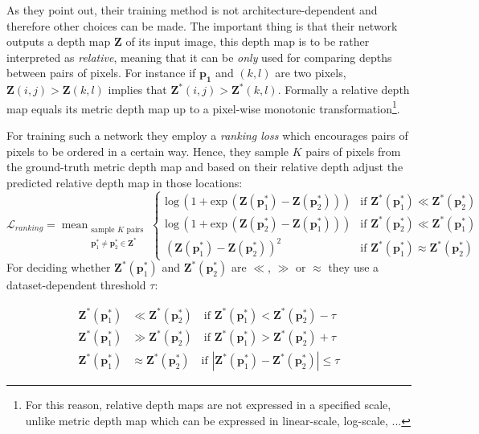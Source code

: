 As they point out, their training method is not architecture-dependent and therefore other choices can be made.
The important thing is that their network outputs a depth map $\mathbf{Z}$ of its input image, this depth map is to be rather interpreted as \textit{relative}, meaning that it can be \textit{only} used for comparing depths between pairs of pixels.
For instance if $\mathbf{p_{1}}$ and $(k,l)$ are two pixels, $\mathbf{Z}(i, j) > \mathbf{Z}(k,l)$ implies that $\mathbf{Z}^{*}(i, j) > \mathbf{Z}^{*}(k,l)$.
Formally a relative depth map equals its metric depth map up to a pixel-wise monotonic transformation\footnote{For this reason, relative depth maps are not expressed in a specified scale, unlike metric depth map which can be expressed in linear-scale, log-scale, ...}.

For training such a network they employ a \textit{ranking loss} which encourages pairs of pixels to be ordered in a certain way.
Hence, they sample $K$ pairs of pixels from the ground-truth metric depth map and based on their relative depth adjust the predicted relative depth map in those locations:
\[
	\mathcal{L}_{ranking} = \mathop{\text{mean}}_{
		\substack{
			\text{sample } K \text{ pairs}\\
			 \mathbf{p}^{*}_{1} \neq \mathbf{p}^{*}_{2} \in \mathbf{Z}^{*}}
		}
	\begin{cases}
		\text{log} \, ( 1 + \text{exp} \, ( \mathbf{Z}(\mathbf{p}^{*}_{1}) - \mathbf{Z}(\mathbf{p}^{*}_{2}) )) &
			\text{if } \mathbf{Z}^{*}(\mathbf{p}^{*}_{1}) \ll \mathbf{Z}^{*}(\mathbf{p}^{*}_{2}) \\
		\text{log} \, ( 1 + \text{exp} \, ( \mathbf{Z}(\mathbf{p}^{*}_{2}) - \mathbf{Z}(\mathbf{p}^{*}_{1}) )) &
			\text{if } \mathbf{Z}^{*}(\mathbf{p}^{*}_{2}) \ll \mathbf{Z}^{*}(\mathbf{p}^{*}_{1}) \\
		(\mathbf{Z}(\mathbf{p}^{*}_{1}) - \mathbf{Z}(\mathbf{p}^{*}_{2}) )^{2} &
			\text{if } \mathbf{Z}^{*}(\mathbf{p}^{*}_{1}) \approx \mathbf{Z}^{*}(\mathbf{p}^{*}_{2})
	\end{cases}
\]
For deciding whether $\mathbf{Z}^{*}(\mathbf{p}^{*}_{1})$ and  $\mathbf{Z}^{*}(\mathbf{p}^{*}_{2})$ are $\ll$, $\gg$ or $\approx$ they use a dataset-dependent threshold $\tau$:

\begin{align*}
	\mathbf{Z}^{*}(\mathbf{p}^{*}_{1}) & \ll \mathbf{Z}^{*}(\mathbf{p}^{*}_{2}) \quad
		\text{if } \mathbf{Z}^{*}(\mathbf{p}^{*}_{1}) < \mathbf{Z}^{*}(\mathbf{p}^{*}_{2}) - \tau\\
	\mathbf{Z}^{*}(\mathbf{p}^{*}_{1}) & \gg \mathbf{Z}^{*}(\mathbf{p}^{*}_{2}) \quad
		\text{if } \mathbf{Z}^{*}(\mathbf{p}^{*}_{1}) > \mathbf{Z}^{*}(\mathbf{p}^{*}_{2}) + \tau\\
	\mathbf{Z}^{*}(\mathbf{p}^{*}_{1}) & \approx \mathbf{Z}^{*}(\mathbf{p}^{*}_{2}) \quad
		\text{if } |\mathbf{Z}^{*}(\mathbf{p}^{*}_{1}) - \mathbf{Z}^{*}(\mathbf{p}^{*}_{2})| \leq \tau
\end{align*}

